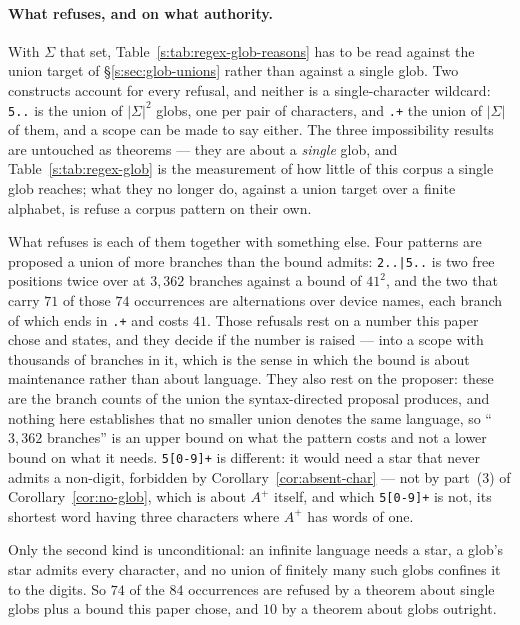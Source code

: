 \paragraph{What refuses, and on what authority.}
With $\Sigma$ that set, Table~\ref{s:tab:regex-glob-reasons} has to be read against the
union target of \S\ref{s:sec:glob-unions} rather than against a single glob. Two
constructs account for every refusal, and neither is a single-character wildcard:
\texttt{5..} is the union of $|\Sigma|^{2}$ globs, one per pair of characters, and
\texttt{.+} the union of $|\Sigma|$ of them, and a scope can be made to say either. The
three impossibility results are untouched as theorems --- they are about a \emph{single}
glob, and Table~\ref{s:tab:regex-glob} is the measurement of how little of this corpus a
single glob reaches; what they no longer do, against a union target over a finite
alphabet, is refuse a corpus pattern on their own.

What refuses is each of them together with something else. Four patterns are proposed a
union of more branches than the bound admits: \texttt{2..|5..} is two free positions twice
over at $3{,}362$ branches against a bound of $41^{2}$, and the two that carry $71$ of
those $74$ occurrences are alternations over device names, each branch of which ends in
\texttt{.+} and costs $41$. Those refusals rest on a number this paper chose and states,
and they decide if the number is raised --- into a scope with thousands of branches in it,
which is the sense in which the bound is about maintenance rather than about language.
They also rest on the proposer: these are the branch counts of the union the
syntax-directed proposal produces, and nothing here establishes that no smaller union
denotes the same language, so ``$3{,}362$ branches'' is an upper bound on what the pattern
costs and not a lower bound on what it needs. \texttt{5[0-9]+} is different:
it would need a star that never admits a non-digit, forbidden by
Corollary~\ref{cor:absent-char} --- not by part~(3) of Corollary~\ref{cor:no-glob}, which
is about $A^{+}$ itself, and which \texttt{5[0-9]+} is not, its shortest word having three
characters where $A^{+}$ has words of one.

Only the second kind is unconditional: an infinite language needs a star, a glob's star
admits every character, and no union of finitely many such globs confines it to the
digits. So $74$ of the $84$ occurrences are refused by a theorem about single globs plus a
bound this paper chose, and $10$ by a theorem about globs outright.

